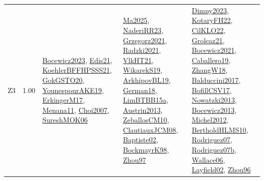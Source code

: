 {\begin{longtable}{p{3cm}r>{\raggedright\arraybackslash}p{6cm}>{\raggedright\arraybackslash}p{6cm}>{\raggedright\arraybackslash}p{8cm}}
\index{Z3}\index{CPSystems!Z3}Z3 &  1.00 & \hyperref[detail:Bocewicz2023]{Bocewicz2023}, \hyperref[detail:Edis21]{Edis21}, \hyperref[detail:KoehlerBFFHPSSS21]{KoehlerBFFHPSSS21}, \hyperref[detail:GokGSTO20]{GokGSTO20}, \hyperref[detail:YounespourAKE19]{YounespourAKE19}, \hyperref[detail:ErkingerM17]{ErkingerM17}, \hyperref[detail:Menana11]{Menana11}, \hyperref[detail:Choi2007]{Choi2007}, \hyperref[detail:SureshMOK06]{SureshMOK06} & \hyperref[detail:Ma2025]{Ma2025}, \hyperref[detail:NaderiRR23]{NaderiRR23}, \hyperref[detail:Grzegorz2021]{Grzegorz2021}, \hyperref[detail:Radzki2021]{Radzki2021}, \hyperref[detail:VlkHT21]{VlkHT21}, \hyperref[detail:WikarekS19]{WikarekS19}, \hyperref[detail:ArkhipovBL19]{ArkhipovBL19}, \hyperref[detail:German18]{German18}, \hyperref[detail:LimBTBB15a]{LimBTBB15a}, \hyperref[detail:Austrin2013]{Austrin2013}, \hyperref[detail:ZeballosCM10]{ZeballosCM10}, \hyperref[detail:ClautiauxJCM08]{ClautiauxJCM08}, \hyperref[detail:Baptiste02]{Baptiste02}, \hyperref[detail:BockmayrK98]{BockmayrK98}, \hyperref[detail:Zhou97]{Zhou97} & \hyperref[detail:Dimny2023]{Dimny2023}, \hyperref[detail:KotaryFH22]{KotaryFH22}, \hyperref[detail:CilKLO22]{CilKLO22}, \hyperref[detail:Groleaz21]{Groleaz21}, \hyperref[detail:Bocewicz2021]{Bocewicz2021}, \hyperref[detail:Caballero19]{Caballero19}, \hyperref[detail:ZhangW18]{ZhangW18}, \hyperref[detail:Balduccini2017]{Balduccini2017}, \hyperref[detail:BofillCSV17]{BofillCSV17}, \hyperref[detail:Nowatzki2013]{Nowatzki2013}, \hyperref[detail:Bocewicz2013]{Bocewicz2013}, \hyperref[detail:Michel2012]{Michel2012}, \hyperref[detail:BertholdHLMS10]{BertholdHLMS10}, \hyperref[detail:Rodriguez07]{Rodriguez07}, \hyperref[detail:Rodriguez07b]{Rodriguez07b}, \hyperref[detail:Wallace06]{Wallace06}, \hyperref[detail:Layfield02]{Layfield02}, \hyperref[detail:Zhou96]{Zhou96}\\
\end{longtable}
}

\clearpage
